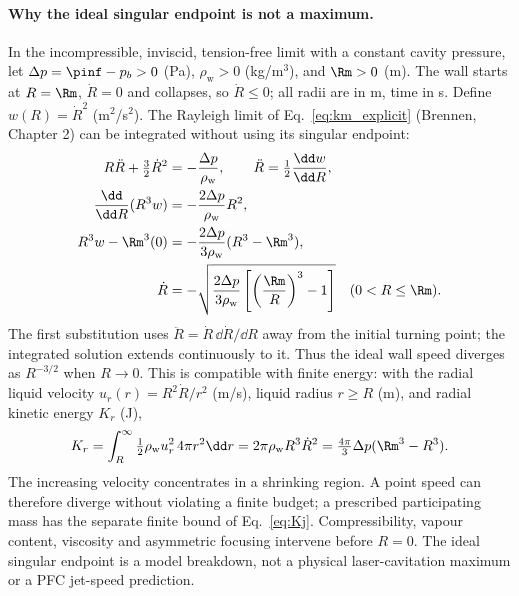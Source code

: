 \paragraph{Why the ideal singular endpoint is not a maximum.}
In the incompressible, inviscid, tension-free limit with a constant cavity pressure,
let $\Delta p=\pinf-p_b>0$ (Pa), $\rho_{\mathrm w}>0$ (kg/m$^3$), and $\Rm>0$ (m).
The wall starts at $R=\Rm$, $\dot R=0$ and collapses, so $\dot R\le0$; all radii are in m,
time in s. Define $w(R)=\dot R^2$ (m$^2$/s$^2$). The Rayleigh limit of
Eq.~\eqref{eq:km_explicit} (Brennen, Chapter 2) can be integrated without using its singular endpoint:
\begin{align}
R\ddot R+\tfrac32\dot R^2&=-\frac{\Delta p}{\rho_{\mathrm w}},\qquad
\ddot R=\tfrac12\frac{\dd w}{\dd R},\notag\\
\frac{\dd}{\dd R}(R^3w)&=-\frac{2\Delta p}{\rho_{\mathrm w}}R^2,\notag\\
R^3w-\Rm^3(0)&=-\frac{2\Delta p}{3\rho_{\mathrm w}}(R^3-\Rm^3),\notag\\
\dot R&=-\sqrt{\frac{2\Delta p}{3\rho_{\mathrm w}}
\left[\left(\frac{\Rm}{R}\right)^3-1\right]}\quad(0<R\le\Rm).
\label{eq:rayleigh_speed}
\end{align}
The first substitution uses $\ddot R=\dot R\,\dd\dot R/\dd R$ away from the initial turning point;
the integrated solution extends continuously to it. Thus the ideal wall speed diverges as
$R^{-3/2}$ when $R\to0$. This is compatible with finite energy: with the radial liquid velocity
$u_r(r)=R^2\dot R/r^2$ (m/s), liquid radius $r\ge R$ (m), and radial kinetic energy $K_r$ (J),
\begin{equation}
K_r=\int_R^\infty\tfrac12\rho_{\mathrm w}u_r^2\,4\pi r^2\dd r
=2\pi\rho_{\mathrm w}R^3\dot R^2
=\tfrac{4\pi}{3}\Delta p(\Rm^3-R^3).
\label{eq:rayleigh_energy}
\end{equation}
The increasing velocity concentrates in a shrinking region. A point speed can therefore diverge
without violating a finite budget; a prescribed participating mass has the separate finite bound
of Eq.~\eqref{eq:Kj}. Compressibility, vapour content, viscosity and asymmetric focusing intervene
before $R=0$. The ideal singular endpoint is a model breakdown, not a physical laser-cavitation
maximum or a PFC jet-speed prediction.

